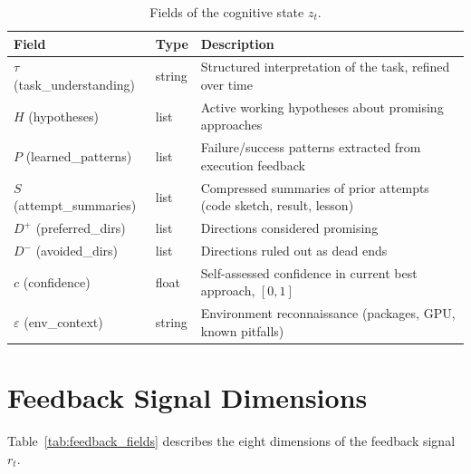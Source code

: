 \documentclass{article} %
\newcommand{\zt}{z_t}
\newcommand{\rt}{r_t}
\begin{document}
\begin{table}[ht]
\centering
\caption{Fields of the cognitive state $\zt$.}
\label{tab:state_fields}
\small
\begin{tabular}{@{}llp{5.5cm}@{}}
\toprule
\textbf{Field} & \textbf{Type} & \textbf{Description} \\
\midrule
$\tau$ (task\_understanding)  & string  & Structured interpretation of the
task, refined over time \\
$H$ (hypotheses)              & list    & Active working hypotheses about
promising approaches \\
$P$ (learned\_patterns)       & list    & Failure/success patterns extracted
from execution feedback \\
$S$ (attempt\_summaries)      & list    & Compressed summaries of prior
attempts (code sketch, result, lesson) \\
$D^{+}$ (preferred\_dirs)     & list    & Directions considered promising \\
$D^{-}$ (avoided\_dirs)       & list    & Directions ruled out as dead ends \\
$c$ (confidence)              & float   & Self-assessed confidence in current
best approach, $[0, 1]$ \\
$\varepsilon$ (env\_context)  & string  & Environment reconnaissance
(packages, GPU, known pitfalls) \\
\bottomrule
\end{tabular}
\end{table}


\section{Feedback Signal Dimensions}
\label{sec:app_feedback}

Table~\ref{tab:feedback_fields} describes the eight dimensions of the feedback
signal $\rt$.
\end{document}
